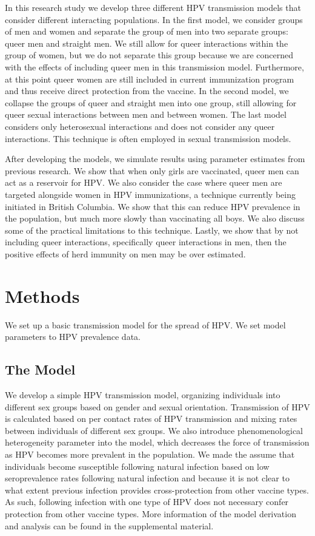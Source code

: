 \documentclass[12pt]{article}
\begin{document}
In this research study we develop three different HPV transmission models that consider different interacting populations.  In the first model, we consider groups of men and women and separate the group of men into two separate groups: queer men and straight men.  We still allow for queer interactions within the group of women, but we do not separate this group because we are concerned with the effects of including queer men in this transmission model.  Furthermore, at this point queer women are still included in current immunization program and thus receive direct protection from the vaccine. In the second model, we collapse the groups of queer and straight men into one group, still allowing for queer sexual interactions between men and between women.  The last model considers only heterosexual interactions and does not consider any queer interactions.  This technique is often employed in sexual transmission models.

After developing the models, we simulate results using parameter estimates from previous research.  We show that when only girls are vaccinated, queer men can act as a reservoir for HPV.  We also consider the case where queer men are targeted alongside women in HPV immunizations, a technique currently being initiated in British Columbia.  We show that this can reduce HPV prevalence in the population, but much more slowly than vaccinating all boys.  We also discuss some of the practical limitations to this technique.  Lastly, we show that by not including queer interactions, specifically queer interactions in men, then the positive effects of herd immunity on men may be over estimated. 

\section{Methods}
We set up a basic transmission model for the spread of HPV. We set model parameters to HPV prevalence data.  

\subsection{The Model}
We develop a simple HPV transmission model, organizing individuals into different sex groups based on gender and sexual orientation.  Transmission of HPV is calculated based on per contact rates of HPV transmission and mixing rates between individuals of different sex groups.  We also introduce phenomenological heterogeneity parameter into the model, which decreases the force of transmission as HPV becomes more prevalent in the population.  We made the assume that individuals become susceptible following natural infection based on low seroprevalence rates following natural infection and because it is not clear to what extent previous infection provides cross-protection from other vaccine types.  As such, following infection with one type of HPV does not necessary confer protection from other vaccine types.  More information of the model derivation and analysis can be found in the supplemental material. 
\end{document}
